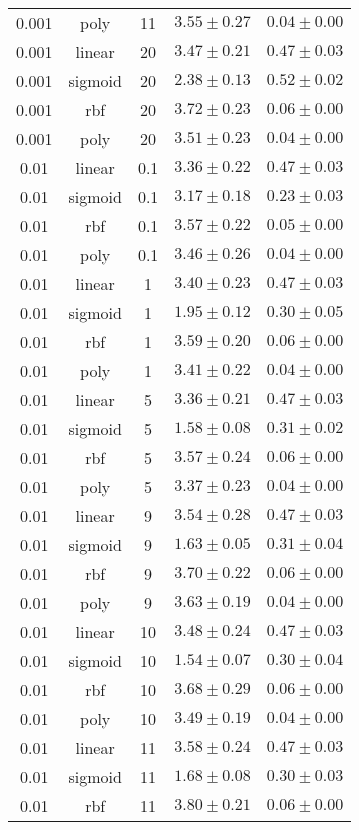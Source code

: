 \begin{tabular}{cccrr}
0.001 & poly & 11 & $3.55 \pm 0.27$ & $0.04 \pm 0.00$\\
0.001 & linear & 20 & $3.47 \pm 0.21$ & $0.47 \pm 0.03$\\
0.001 & sigmoid & 20 & $2.38 \pm 0.13$ & $0.52 \pm 0.02$\\
0.001 & rbf & 20 & $3.72 \pm 0.23$ & $0.06 \pm 0.00$\\
0.001 & poly & 20 & $3.51 \pm 0.23$ & $0.04 \pm 0.00$\\
0.01 & linear & 0.1 & $3.36 \pm 0.22$ & $0.47 \pm 0.03$\\
0.01 & sigmoid & 0.1 & $3.17 \pm 0.18$ & $0.23 \pm 0.03$\\
0.01 & rbf & 0.1 & $3.57 \pm 0.22$ & $0.05 \pm 0.00$\\
0.01 & poly & 0.1 & $3.46 \pm 0.26$ & $0.04 \pm 0.00$\\
0.01 & linear & 1 & $3.40 \pm 0.23$ & $0.47 \pm 0.03$\\
0.01 & sigmoid & 1 & $1.95 \pm 0.12$ & $0.30 \pm 0.05$\\
0.01 & rbf & 1 & $3.59 \pm 0.20$ & $0.06 \pm 0.00$\\
0.01 & poly & 1 & $3.41 \pm 0.22$ & $0.04 \pm 0.00$\\
0.01 & linear & 5 & $3.36 \pm 0.21$ & $0.47 \pm 0.03$\\
0.01 & sigmoid & 5 & $1.58 \pm 0.08$ & $0.31 \pm 0.02$\\
0.01 & rbf & 5 & $3.57 \pm 0.24$ & $0.06 \pm 0.00$\\
0.01 & poly & 5 & $3.37 \pm 0.23$ & $0.04 \pm 0.00$\\
0.01 & linear & 9 & $3.54 \pm 0.28$ & $0.47 \pm 0.03$\\
0.01 & sigmoid & 9 & $1.63 \pm 0.05$ & $0.31 \pm 0.04$\\
0.01 & rbf & 9 & $3.70 \pm 0.22$ & $0.06 \pm 0.00$\\
0.01 & poly & 9 & $3.63 \pm 0.19$ & $0.04 \pm 0.00$\\
0.01 & linear & 10 & $3.48 \pm 0.24$ & $0.47 \pm 0.03$\\
0.01 & sigmoid & 10 & $1.54 \pm 0.07$ & $0.30 \pm 0.04$\\
0.01 & rbf & 10 & $3.68 \pm 0.29$ & $0.06 \pm 0.00$\\
0.01 & poly & 10 & $3.49 \pm 0.19$ & $0.04 \pm 0.00$\\
0.01 & linear & 11 & $3.58 \pm 0.24$ & $0.47 \pm 0.03$\\
0.01 & sigmoid & 11 & $1.68 \pm 0.08$ & $0.30 \pm 0.03$\\
0.01 & rbf & 11 & $3.80 \pm 0.21$ & $0.06 \pm 0.00$\\

\end{tabular}
